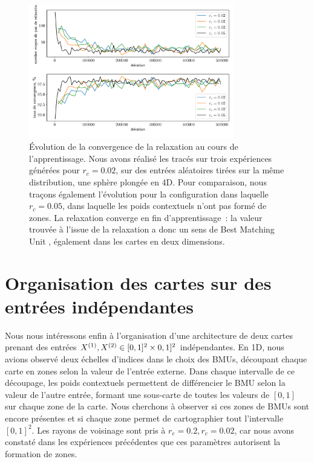 \documentclass[../main]{subfiles}
\begin{document}
\begin{figure}
	\centering
	\includegraphics[width=0.8\textwidth]{conv_relax_2maps.pdf}
	\vspace{-0.5cm}
	\caption{\'Evolution de la convergence de la relaxation au cours de l'apprentissage. Nous avons réalisé les tracés sur trois expériences générées pour $r_c = 0.02$, sur des entrées aléatoires tirées sur la même distribution, une sphère plongée en 4D. Pour comparaison, nous traçons également l'évolution pour la configuration dans laquelle $r_c = 0.05$, dans laquelle les poids contextuels n'ont pas formé de zones. La relaxation converge en fin d'apprentissage~: la valeur trouvée à l'issue de la relaxation a donc un sens de \og Best Matching Unit \fg{}, également dans les cartes en deux dimensions. \label{fig:relax2D}}
\end{figure}

\section{Organisation des cartes sur des entrées indépendantes \label{par:cub2D}}

Nous nous intéressons enfin à l'organisation d'une architecture de deux cartes prenant des entrées $X^{({1})}, X^{({2})} \in [0,1]^2 \times 0,1]^2$ indépendantes.
En 1D, nous avions observé deux échelles d'indices dans le choix des BMUs, découpant chaque carte en zones selon la valeur de l'entrée externe. Dans chaque intervalle de ce découpage, les poids contextuels permettent de différencier le BMU selon la valeur de l'autre entrée, formant une sous-carte de toutes les valeurs de $[0,1]$ sur chaque zone de la carte. Nous cherchons à observer si ces zones de BMUs sont encore présentes et si chaque zone permet de cartographier tout l'intervalle $[0,1]^2$.
Les rayons de voisinage sont pris à $r_e = 0.2, r_c = 0.02$, car nous avons constaté dans les expériences précédentes que ces paramètres autorisent la formation de zones.
\end{document}
